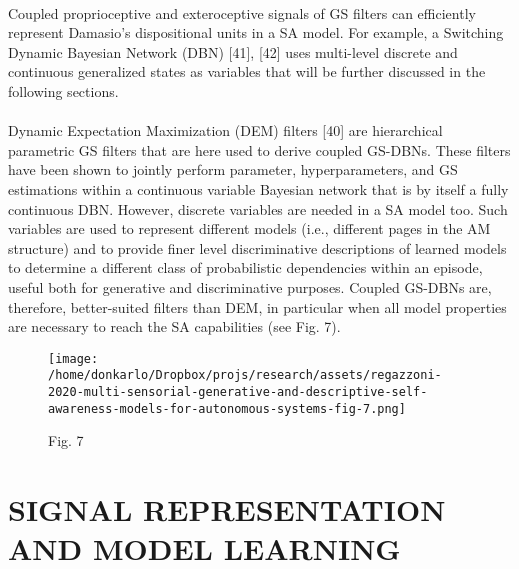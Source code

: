 \documentclass{article}
\begin{document}
		\paragraph{} Coupled proprioceptive and exteroceptive signals of GS
		filters can efficiently represent Damasio’s dispositional units
		in a SA model. For example, a Switching Dynamic Bayesian
		Network (DBN) [41], [42] uses multi-level discrete and continuous generalized states as variables that will be further
		discussed in the following sections.
		\paragraph{} Dynamic Expectation Maximization (DEM) filters [40] are
		hierarchical parametric GS filters that are here used to
		derive coupled GS-DBNs. These filters have been shown to
		jointly perform parameter, hyperparameters, and GS estimations within a continuous variable Bayesian network that is
		by itself a fully continuous DBN. However, discrete variables
		are needed in a SA model too. Such variables are used to
		represent different models (i.e., different pages in the AM
		structure) and to provide finer level discriminative descriptions
		of learned models to determine a different class of probabilistic
		dependencies within an episode, useful both for generative
		and discriminative purposes. Coupled GS-DBNs are, therefore,
		better-suited filters than DEM, in particular when all model
		properties are necessary to reach the SA capabilities (see
		Fig. 7).
		\begin{figure*}
			\centering
			\texttt{[image: /home/donkarlo/Dropbox/projs/research/assets/regazzoni-2020-multi-sensorial-generative-and-descriptive-self-awareness-models-for-autonomous-systems-fig-7.png]}
			\caption{\cite{regazzoni-2020-multi-sensorial-generative-and-descriptive-self-awareness-models-for-autonomous-systems}Fig. 7}
			\label{fig:regazzoni-2020-multi-sensorial-generative-and-descriptive-self-awareness-models-for-autonomous-systems-fig-7.png}
		\end{figure*}
	
	\section{ SIGNAL REPRESENTATION AND MODEL LEARNING}
\end{document}
